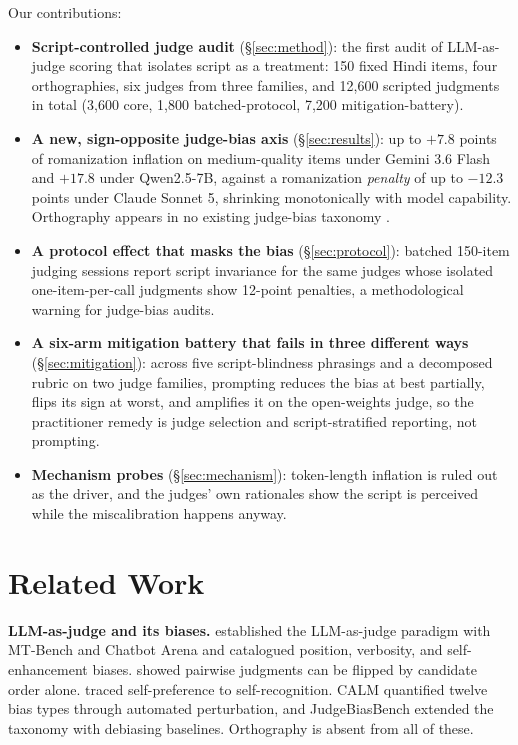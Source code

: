 \documentclass[10pt,twocolumn]{article}
\begin{document}
Our contributions:
\begin{itemize}
  \item[\textcolor{slate}{$\bullet$}] \textbf{Script-controlled judge audit} (\S\ref{sec:method}): the first audit of LLM-as-judge scoring that isolates script as a treatment: 150 fixed Hindi items, four orthographies, six judges from three families, and 12{,}600 scripted judgments in total (3{,}600 core, 1{,}800 batched-protocol, 7{,}200 mitigation-battery).
  \item[\textcolor{slate}{$\bullet$}] \textbf{A new, sign-opposite judge-bias axis} (\S\ref{sec:results}): up to $+7.8$ points of romanization inflation on medium-quality items under Gemini 3.6 Flash and $+17.8$ under Qwen2.5-7B, against a romanization \emph{penalty} of up to $-12.3$ points under Claude Sonnet 5, shrinking monotonically with model capability. Orthography appears in no existing judge-bias taxonomy \citep{ye2024justice, zhou2026judgebiasbench}.
  \item[\textcolor{slate}{$\bullet$}] \textbf{A protocol effect that masks the bias} (\S\ref{sec:protocol}): batched 150-item judging sessions report script invariance for the same judges whose isolated one-item-per-call judgments show 12-point penalties, a methodological warning for judge-bias audits.
  \item[\textcolor{slate}{$\bullet$}] \textbf{A six-arm mitigation battery that fails in three different ways} (\S\ref{sec:mitigation}): across five script-blindness phrasings and a decomposed rubric on two judge families, prompting reduces the bias at best partially, flips its sign at worst, and amplifies it on the open-weights judge, so the practitioner remedy is judge selection and script-stratified reporting, not prompting.
  \item[\textcolor{slate}{$\bullet$}] \textbf{Mechanism probes} (\S\ref{sec:mechanism}): token-length inflation is ruled out as the driver, and the judges' own rationales show the script is perceived while the miscalibration happens anyway.
\end{itemize}

\section{Related Work}
\label{sec:related}

\textbf{LLM-as-judge and its biases.} \citet{zheng2023judging} established the LLM-as-judge paradigm with MT-Bench and Chatbot Arena and catalogued position, verbosity, and self-enhancement biases. \citet{wang2023fair} showed pairwise judgments can be flipped by candidate order alone. \citet{panickssery2024self} traced self-preference to self-recognition. CALM \citep{ye2024justice} quantified twelve bias types through automated perturbation, and JudgeBiasBench \citep{zhou2026judgebiasbench} extended the taxonomy with debiasing baselines. Orthography is absent from all of these.
\end{document}
